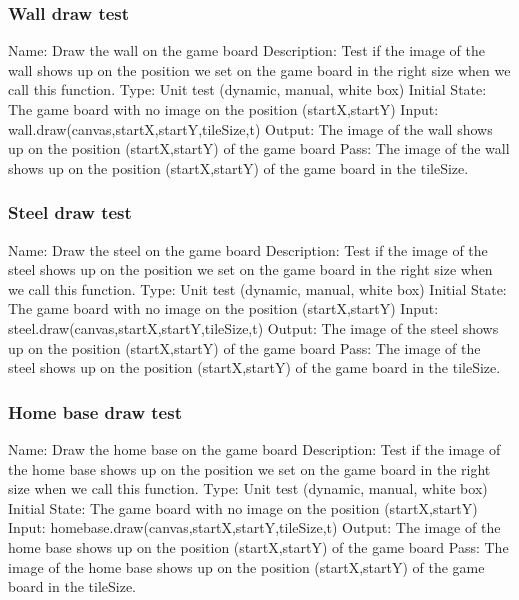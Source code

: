 \documentclass{article}
\begin{document}
\subsubsection{Wall draw test}
Name:  Draw the wall on the game board\newline
Description: Test if the image of the wall shows up on the position we set on
 the game board in the right size when we call this function. \newline
Type: Unit test (dynamic, manual, white box) \newline
Initial State:  The game board with no image on the position (startX,startY) 
\newline
Input: wall.draw(canvas,startX,startY,tileSize,t)\newline
Output: The image of the wall shows up on the position (startX,startY) of the 
game board\newline
Pass:  The image of the wall shows up on the position (startX,startY) of the 
game board in the tileSize. \newline

\subsubsection{Steel draw test}
Name:  Draw the steel on the game board\newline
Description: Test if the image of the steel shows up on the position we set on 
the game board in the right size when we call this function. \newline
Type: Unit test (dynamic, manual, white box) \newline
Initial State:  The game board with no image on the position (startX,startY) 
\newline
Input: steel.draw(canvas,startX,startY,tileSize,t)\newline
Output: The image of the steel shows up on the position (startX,startY) of the
 game board\newline
Pass:  The image of the steel shows up on the position (startX,startY) of the 
game board in the tileSize. \newline

\subsubsection{Home base draw test}
Name:  Draw the home base on the game board\newline
Description: Test if the image of the home base shows up on the position we 
set on the game board in the right size when we call this function. \newline
Type: Unit test (dynamic, manual, white box) \newline
Initial State:  The game board with no image on the position (startX,startY) 
\newline
Input: homebase.draw(canvas,startX,startY,tileSize,t)\newline
Output: The image of the home base shows up on the position (startX,startY) of
 the game board\newline
Pass:  The image of the home base shows up on the position (startX,startY) of 
the game board in the tileSize. \newline
\end{document}

